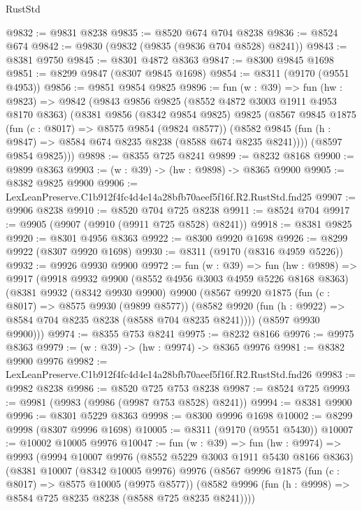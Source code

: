 \begin{lexlean}{RustStd}
\begin{coremodule}
@9832 := @9831 @8238
@9835 := @8520 @674 @704 @8238
@9836 := @8524 @674
@9842 := @9830 (@9832 (@9835 (@9836 @704 @8528) @8241))
@9843 := @8381 @9750
@9845 := @8301 @4872 @8363
@9847 := @8300 @9845 @1698
@9851 := @8299 @9847 (@8307 @9845 @1698)
@9854 := @8311 (@9170 (@9551 @4953))
@9856 := @9851 @9854 @9825
@9896 := fun (w : @39) =>
  fun (hw : @9823) =>
  @9842
    (@9843
      @9856
      @9825
      (@8552 @4872 @3003 @1911 @4953 @8170 @8363)
      (@8381
        @9856
        (@8342 @9854 @9825)
        @9825
        (@8567
          @9845
          @1875
          (fun (c : @8017) => @8575 @9854 (@9824 @8577))
          (@8582 @9845 (fun (h : @9847) => @8584 @674 @8235 @8238 (@8588 @674 @8235 @8241))))
        (@8597 @9854 @9825)))
@9898 := @8355 @725 @8241
@9899 := @8232 @8168
@9900 := @9899 @8363
@9903 := (w : @39) -> (hw : @9898) -> @8365 @9900
@9905 := @8382 @9825 @9900
@9906 := LexLeanPreserve.C1b912f4fc4d4e14a28bfb70aeef5f16f.R2.RustStd.fnd25
@9907 := @9906 @8238
@9910 := @8520 @704 @725 @8238
@9911 := @8524 @704
@9917 := @9905 (@9907 (@9910 (@9911 @725 @8528) @8241))
@9918 := @8381 @9825
@9920 := @8301 @4956 @8363
@9922 := @8300 @9920 @1698
@9926 := @8299 @9922 (@8307 @9920 @1698)
@9930 := @8311 (@9170 (@8316 @4959 @5226))
@9932 := @9926 @9930 @9900
@9972 := fun (w : @39) =>
  fun (hw : @9898) =>
  @9917
    (@9918
      @9932
      @9900
      (@8552 @4956 @3003 @4959 @5226 @8168 @8363)
      (@8381
        @9932
        (@8342 @9930 @9900)
        @9900
        (@8567
          @9920
          @1875
          (fun (c : @8017) => @8575 @9930 (@9899 @8577))
          (@8582 @9920 (fun (h : @9922) => @8584 @704 @8235 @8238 (@8588 @704 @8235 @8241))))
        (@8597 @9930 @9900)))
@9974 := @8355 @753 @8241
@9975 := @8232 @8166
@9976 := @9975 @8363
@9979 := (w : @39) -> (hw : @9974) -> @8365 @9976
@9981 := @8382 @9900 @9976
@9982 := LexLeanPreserve.C1b912f4fc4d4e14a28bfb70aeef5f16f.R2.RustStd.fnd26
@9983 := @9982 @8238
@9986 := @8520 @725 @753 @8238
@9987 := @8524 @725
@9993 := @9981 (@9983 (@9986 (@9987 @753 @8528) @8241))
@9994 := @8381 @9900
@9996 := @8301 @5229 @8363
@9998 := @8300 @9996 @1698
@10002 := @8299 @9998 (@8307 @9996 @1698)
@10005 := @8311 (@9170 (@9551 @5430))
@10007 := @10002 @10005 @9976
@10047 := fun (w : @39) =>
  fun (hw : @9974) =>
  @9993
    (@9994
      @10007
      @9976
      (@8552 @5229 @3003 @1911 @5430 @8166 @8363)
      (@8381
        @10007
        (@8342 @10005 @9976)
        @9976
        (@8567
          @9996
          @1875
          (fun (c : @8017) => @8575 @10005 (@9975 @8577))
          (@8582 @9996 (fun (h : @9998) => @8584 @725 @8235 @8238 (@8588 @725 @8235 @8241))))

\end{coremodule}
\end{lexlean}
